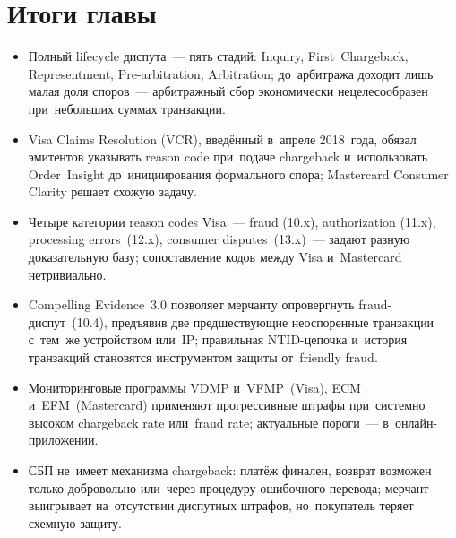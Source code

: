 \section*{Итоги главы}

\begin{itemize}
  \item Полный lifecycle диспута~--- пять стадий: Inquiry,
        First~Chargeback, Representment, Pre-arbitration, Arbitration;
        до~арбитража доходит лишь малая доля споров~--- арбитражный сбор
        экономически нецелесообразен при~небольших суммах транзакции.
  \item Visa Claims Resolution (VCR), введённый в~апреле 2018~года,
        обязал эмитентов указывать reason code при~подаче chargeback
        и~использовать Order~Insight до~инициирования формального спора;
        Mastercard Consumer Clarity решает схожую задачу.
  \item Четыре категории reason codes Visa~--- fraud (10.x), authorization
        (11.x), processing errors~(12.x), consumer disputes~(13.x)~---
        задают разную доказательную базу; сопоставление кодов между Visa
        и~Mastercard нетривиально.
  \item Compelling Evidence~3.0 позволяет мерчанту опровергнуть
        fraud-диспут~(10.4), предъявив две предшествующие неоспоренные
        транзакции с~тем~же устройством или~IP; правильная NTID-цепочка
        и~история транзакций становятся инструментом защиты от~friendly
        fraud.
  \item Мониторинговые программы VDMP и~VFMP~(Visa), ECM и~EFM~(Mastercard)
        применяют прогрессивные штрафы при~системно высоком chargeback
        rate или~fraud rate; актуальные пороги~--- в~онлайн-приложении.
  \item СБП не~имеет механизма chargeback: платёж финален, возврат
        возможен только добровольно или~через процедуру ошибочного
        перевода; мерчант выигрывает на~отсутствии диспутных штрафов,
        но~покупатель теряет схемную защиту.
\end{itemize}
